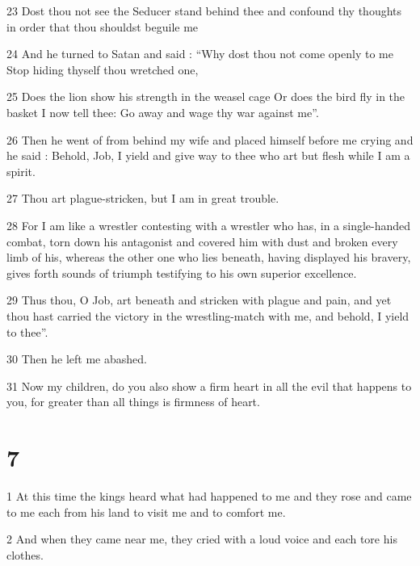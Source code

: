 \par 23 Dost thou not see the Seducer stand behind thee and confound thy thoughts in order that thou shouldst beguile me

\par 24 And he turned to Satan and said : “Why dost thou not come openly to me Stop hiding thyself thou wretched one,

\par 25 Does the lion show his strength in the weasel cage Or does the bird fly in the basket I now tell thee: Go away and wage thy war against me”.

\par 26 Then he went of from behind my wife and placed himself before me crying and he said : Behold, Job, I yield and give way to thee who art but flesh while I am a spirit.

\par 27 Thou art plague-stricken, but I am in great trouble.

\par 28 For I am like a wrestler contesting with a wrestler who has, in a single-handed combat, torn down his antagonist and covered him with dust and broken every limb of his, whereas the other one who lies beneath, having displayed his bravery, gives forth sounds of triumph testifying to his own superior excellence.

\par 29 Thus thou, O Job, art beneath and stricken with plague and pain, and yet thou hast carried the victory in the wrestling-match with me, and behold, I yield to thee”. 

\par 30 Then he left me abashed.

\par 31 Now my children, do you also show a firm heart in all the evil that happens to you, for greater than all things is firmness of heart.

\chapter{7}

\par 1 At this time the kings heard what had happened to me and they rose and came to me each from his land to visit me and to comfort me. 

\par 2 And when they came near me, they cried with a loud voice and each tore his clothes.


